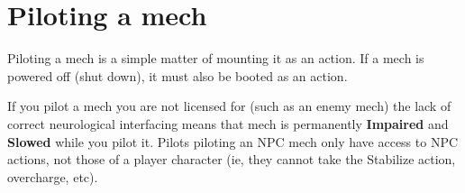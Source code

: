 \section{Piloting a mech}

Piloting a mech is a simple matter of mounting it as an action. If a mech is powered off (shut
down), it must also be booted as an action.

If you pilot a mech you are not licensed for (such as an enemy mech) the lack of correct
neurological interfacing means that mech is permanently \textbf{Impaired} and \textbf{Slowed} while you pilot it.
Pilots piloting an NPC mech only have access to NPC actions, not those of a player character (ie,
they cannot take the Stabilize action, overcharge, etc).